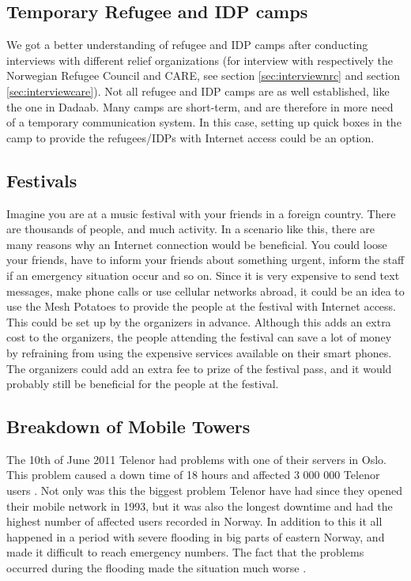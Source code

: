\subsection{Temporary Refugee and IDP camps}
We got a better understanding of refugee and IDP camps after conducting interviews with different relief organizations (for interview with respectively the Norwegian Refugee Council and CARE, see section \ref{sec:interviewnrc} and section \ref{sec:interviewcare}). 
Not all refugee and IDP camps are as well established, like the one in Dadaab. Many camps are short-term, and are therefore in more need of a temporary communication system. In this case, setting up \gls{quick} boxes in the camp to provide the refugees/IDPs with Internet access could be an option. 

\subsection{Festivals}
Imagine you are at a music festival with your friends in a foreign country. There are thousands of people, and much activity. In a scenario like this, there are many reasons why an Internet connection would be beneficial. You could loose your friends, have to inform your friends about something urgent, inform the staff if an emergency situation occur and so on. Since it is very expensive to send text messages, make phone calls or use cellular networks abroad, it could be an idea to use the Mesh Potatoes to provide the people at the festival with Internet access. This could be set up by the organizers in advance. Although this adds an extra cost to the organizers, the people attending the festival can save a lot of money by refraining from using the expensive services available on their smart phones. The organizers could add an extra fee to prize of the festival pass, and it would probably still be beneficial for the people at the festival. 

\subsection{Breakdown of Mobile Towers}

The 10th of June 2011 Telenor had problems with one of their servers in Oslo. This problem caused a down time of 18 hours and affected 3 000 000 Telenor users \cite{listeNedetid}. Not only was this the biggest problem Telenor have had since they opened their mobile network in 1993, but it was also the longest downtime and had the highest number of affected users recorded in Norway. In addition to this it all happened in a period with severe flooding in big parts of eastern Norway, and made it difficult to reach emergency numbers. The fact that the problems occurred during the flooding made the situation much worse \cite{TelenorNede}.

